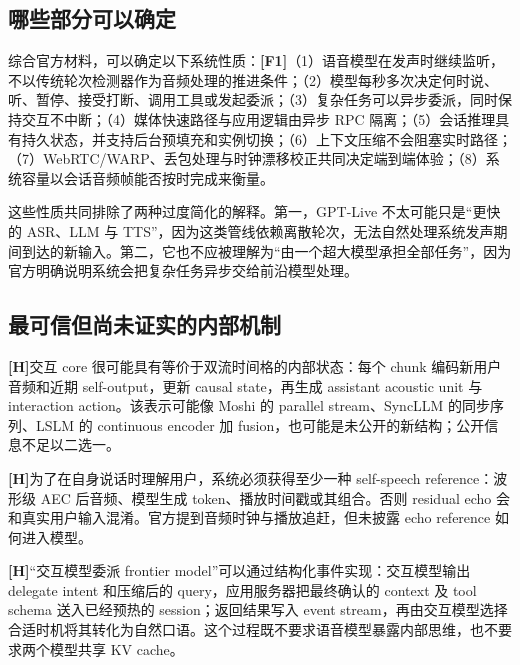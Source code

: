 \documentclass[UTF8,fontset=none,a4paper,10pt]{ctexart}
\newcommand{\FOne}{\textcolor{official}{\textbf{[F1]}}}
\newcommand{\Hyp}{\textcolor{hypothesis}{\textbf{[H]}}}
\begin{document}
\subsection{哪些部分可以确定}

综合官方材料，可以确定以下系统性质：\FOne（1）语音模型在发声时继续监听，不以传统轮次检测器作为音频处理的推进条件；（2）模型每秒多次决定何时说、听、暂停、接受打断、调用工具或发起委派；（3）复杂任务可以异步委派，同时保持交互不中断；（4）媒体快速路径与应用逻辑由异步 RPC 隔离；（5）会话推理具有持久状态，并支持后台预填充和实例切换；（6）上下文压缩不会阻塞实时路径；（7）WebRTC/WARP、丢包处理与时钟漂移校正共同决定端到端体验；（8）系统容量以会话音频帧能否按时完成来衡量\cite{zh:openai2026gptlive,zh:openai2026continuous}。

这些性质共同排除了两种过度简化的解释。第一，GPT-Live 不太可能只是“更快的 ASR、LLM 与 TTS”，因为这类管线依赖离散轮次，无法自然处理系统发声期间到达的新输入。第二，它也不应被理解为“由一个超大模型承担全部任务”，因为官方明确说明系统会把复杂任务异步交给前沿模型处理。

\subsection{最可信但尚未证实的内部机制}

\Hyp 交互 core 很可能具有等价于双流时间格的内部状态：每个 chunk 编码新用户音频和近期 self-output，更新 causal state，再生成 assistant acoustic unit 与 interaction action。该表示可能像 Moshi 的 parallel stream、SyncLLM 的同步序列、LSLM 的 continuous encoder 加 fusion，也可能是未公开的新结构；公开信息不足以二选一。

\Hyp 为了在自身说话时理解用户，系统必须获得至少一种 self-speech reference：波形级 AEC 后音频、模型生成 token、播放时间戳或其组合。否则 residual echo 会和真实用户输入混淆。官方提到音频时钟与播放追赶，但未披露 echo reference 如何进入模型。

\Hyp “交互模型委派 frontier model”可以通过结构化事件实现：交互模型输出 delegate intent 和压缩后的 query，应用服务器把最终确认的 context 及 tool schema 送入已经预热的 session；返回结果写入 event stream，再由交互模型选择合适时机将其转化为自然口语。这个过程既不要求语音模型暴露内部思维，也不要求两个模型共享 KV cache。
\end{document}
